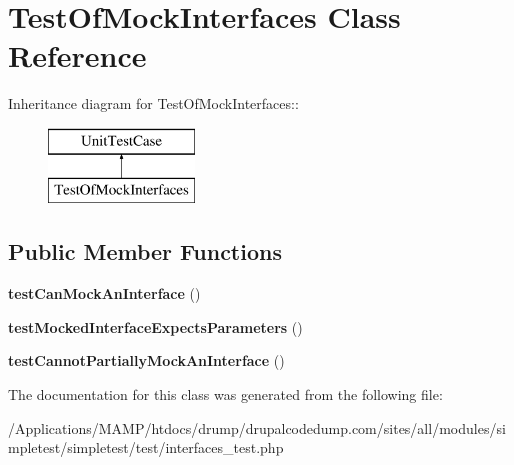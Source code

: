 \hypertarget{class_test_of_mock_interfaces}{
\section{TestOfMockInterfaces Class Reference}
\label{class_test_of_mock_interfaces}
}
Inheritance diagram for TestOfMockInterfaces::\begin{figure}[H]
\begin{center}
\leavevmode
\includegraphics[height=2cm]{class_test_of_mock_interfaces}
\end{center}
\end{figure}
\subsection*{Public Member Functions}
\begin{DoxyCompactItemize}
\item 
\hypertarget{class_test_of_mock_interfaces_adf4905355eb0974c38992eda1ace16f9}{
{\bfseries testCanMockAnInterface} ()}
\label{class_test_of_mock_interfaces_adf4905355eb0974c38992eda1ace16f9}

\item 
\hypertarget{class_test_of_mock_interfaces_adcb600232d7096e1764b1a88e3cd74a9}{
{\bfseries testMockedInterfaceExpectsParameters} ()}
\label{class_test_of_mock_interfaces_adcb600232d7096e1764b1a88e3cd74a9}

\item 
\hypertarget{class_test_of_mock_interfaces_ae49e85dd85705577fc5b282d3c62c720}{
{\bfseries testCannotPartiallyMockAnInterface} ()}
\label{class_test_of_mock_interfaces_ae49e85dd85705577fc5b282d3c62c720}

\end{DoxyCompactItemize}


The documentation for this class was generated from the following file:\begin{DoxyCompactItemize}
\item 
/Applications/MAMP/htdocs/drump/drupalcodedump.com/sites/all/modules/simpletest/simpletest/test/interfaces\_\-test.php\end{DoxyCompactItemize}
